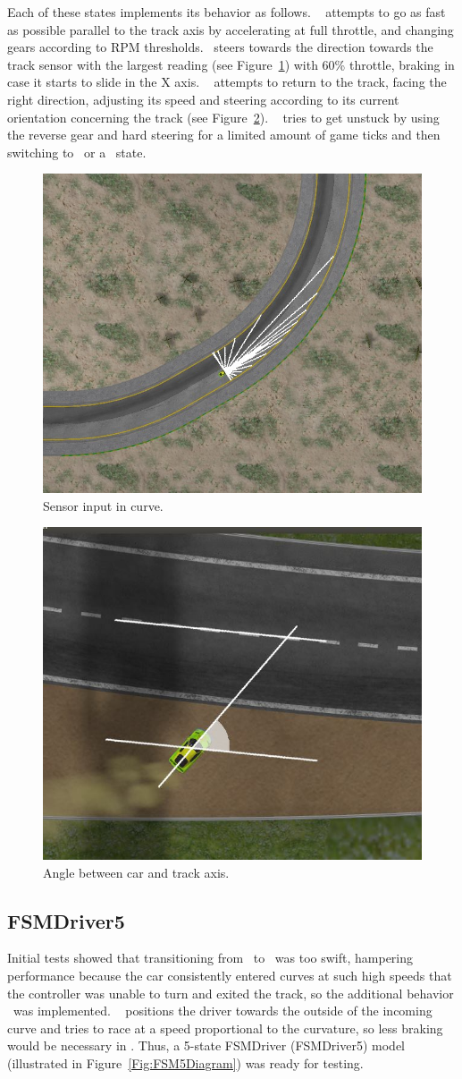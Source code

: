 Each of these states implements its behavior as follows. \SL~ attempts to go as fast as possible parallel to the track axis by accelerating at full throttle, and changing gears according to RPM thresholds. \C~steers towards the direction towards the track sensor with the largest reading (see Figure~\ref{Fig:FSensor}) with 60\% throttle, braking in case it starts to slide in the X axis. \OT~ attempts to return to the track, facing the right direction, adjusting its speed and steering according to its current orientation concerning the track (see Figure~\ref{Fig:Angle}). \St~ tries to get unstuck by using the reverse gear and hard steering for a limited amount of game ticks and then switching to \OT~or a \racing~state.

\begin{figure}[h]
	\centering
	\includegraphics[width=.45\textwidth]{img/FarthestSensor}
	\caption{Sensor input in curve.}
	\label{Fig:FSensor}
\end{figure}

\begin{figure}%
		\centering
		\includegraphics[width=.45\textwidth]{img/ReturnAngle}
		\caption{Angle between car and track axis.}
		\label{Fig:Angle}
\end{figure}

\subsection{FSMDriver5}

Initial tests showed that transitioning from \SL~to \C~was too swift, hampering performance because the car consistently entered curves at such high speeds that the controller was unable to turn and exited the track, so the additional behavior \AC~was implemented. \AC~ positions the driver towards the outside of the incoming curve and tries to race at a speed proportional to the curvature, so less braking would be necessary in \C. Thus, a 5-state FSMDriver (FSMDriver5) model (illustrated in Figure~\ref{Fig:FSM5Diagram}) was ready for testing.

